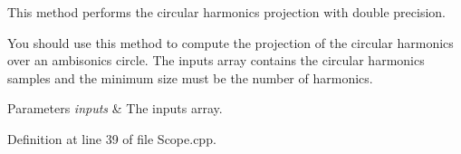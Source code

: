This method performs the circular harmonics projection with double precision. 

You should use this method to compute the projection of the circular harmonics over an ambisonics circle. The inputs array contains the circular harmonics samples and the minimum size must be the number of harmonics.


\begin{DoxyParams}{Parameters}
{\em inputs} & The inputs array. \\
\hline
\end{DoxyParams}


Definition at line 39 of file Scope.\-cpp.

